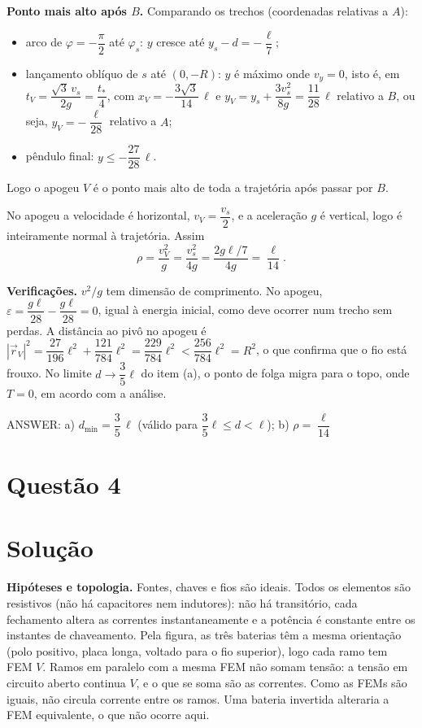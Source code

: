 \documentclass{article}%
\begin{document}
\textbf{Ponto mais alto após $B$.} Comparando os trechos (coordenadas relativas a $A$):
\begin{itemize}
\item arco de $\varphi=-\dfrac{\pi}{2}$ até $\varphi_s$: $y$ cresce até $y_s-d=-\dfrac{\ell}{7}$;
\item lançamento oblíquo de $s$ até $(0,-R)$: $y$ é máximo onde $v_y=0$, isto é, em $t_V=\dfrac{\sqrt3\,v_s}{2g}=\dfrac{t_*}{4}$, com $x_V=-\dfrac{3\sqrt3}{14}\,\ell$ e $y_V=y_s+\dfrac{3v_s^2}{8g}=\dfrac{11}{28}\,\ell$ relativo a $B$, ou seja, $y_V=-\dfrac{\ell}{28}$ relativo a $A$;
\item pêndulo final: $y\le -\dfrac{27}{28}\,\ell$.
\end{itemize}
Logo o apogeu $V$ é o ponto mais alto de toda a trajetória após passar por $B$.

No apogeu a velocidade é horizontal, $v_V=\dfrac{v_s}{2}$, e a aceleração $g$ é vertical, logo é inteiramente normal à trajetória. Assim
\[
\rho=\frac{v_V^2}{g}=\frac{v_s^2}{4g}=\frac{2g\ell/7}{4g}=\frac{\ell}{14}.
\]

\textbf{Verificações.} $v^2/g$ tem dimensão de comprimento. No apogeu, $\varepsilon=\dfrac{g\ell}{28}-\dfrac{g\ell}{28}=0$, igual à energia inicial, como deve ocorrer num trecho sem perdas. A distância ao pivô no apogeu é $|\vec r_V|^2=\dfrac{27}{196}\ell^2+\dfrac{121}{784}\ell^2=\dfrac{229}{784}\ell^2<\dfrac{256}{784}\ell^2=R^2$, o que confirma que o fio está frouxo. No limite $d\to\dfrac{3}{5}\ell$ do item (a), o ponto de folga migra para o topo, onde $T=0$, em acordo com a análise.

ANSWER: a) $d_{\min}=\dfrac{3}{5}\,\ell$ (válido para $\dfrac{3}{5}\ell\le d<\ell$); b) $\rho=\dfrac{\ell}{14}$%
\newpage%
\section*{Questão 4}

\section*{Solução}

\textbf{Hipóteses e topologia.} Fontes, chaves e fios são ideais. Todos os elementos são resistivos (não há capacitores nem indutores): não há transitório, cada fechamento altera as correntes instantaneamente e a potência é constante entre os instantes de chaveamento. Pela figura, as três baterias têm a mesma orientação (polo positivo, placa longa, voltado para o fio superior), logo cada ramo tem FEM $V$. Ramos em paralelo com a mesma FEM não somam tensão: a tensão em circuito aberto continua $V$, e o que se soma são as correntes. Como as FEMs são iguais, não circula corrente entre os ramos. Uma bateria invertida alteraria a FEM equivalente, o que não ocorre aqui.
\end{document}
